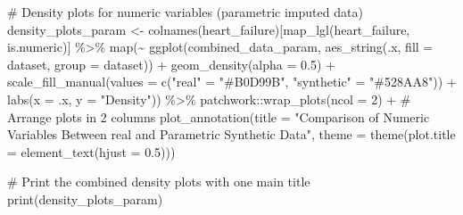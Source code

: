 \documentclass[
  letterpaper,
  DIV=11,
  numbers=noendperiod]{scrartcl}
\newenvironment{Shaded}{\begin{snugshade}}{\end{snugshade}}
\newcommand{\AttributeTok}[1]{\textcolor[rgb]{0.40,0.45,0.13}{#1}}
\newcommand{\CommentTok}[1]{\textcolor[rgb]{0.37,0.37,0.37}{#1}}
\newcommand{\DecValTok}[1]{\textcolor[rgb]{0.68,0.00,0.00}{#1}}
\newcommand{\FloatTok}[1]{\textcolor[rgb]{0.68,0.00,0.00}{#1}}
\newcommand{\FunctionTok}[1]{\textcolor[rgb]{0.28,0.35,0.67}{#1}}
\newcommand{\NormalTok}[1]{\textcolor[rgb]{0.00,0.23,0.31}{#1}}
\newcommand{\OtherTok}[1]{\textcolor[rgb]{0.00,0.23,0.31}{#1}}
\newcommand{\SpecialCharTok}[1]{\textcolor[rgb]{0.37,0.37,0.37}{#1}}
\newcommand{\StringTok}[1]{\textcolor[rgb]{0.13,0.47,0.30}{#1}}
\begin{document}
\begin{Shaded}
\begin{Highlighting}[]
\CommentTok{\# Density plots for numeric variables (parametric imputed data)}
\NormalTok{density\_plots\_param }\OtherTok{\textless{}{-}} \FunctionTok{colnames}\NormalTok{(heart\_failure)[}\FunctionTok{map\_lgl}\NormalTok{(heart\_failure, is.numeric)] }\SpecialCharTok{\%\textgreater{}\%}
  \FunctionTok{map}\NormalTok{(}\SpecialCharTok{\textasciitilde{}} \FunctionTok{ggplot}\NormalTok{(combined\_data\_param, }\FunctionTok{aes\_string}\NormalTok{(.x, }\AttributeTok{fill =} \StringTok{\textquotesingle{}dataset\textquotesingle{}}\NormalTok{, }\AttributeTok{group =} \StringTok{\textquotesingle{}dataset\textquotesingle{}}\NormalTok{)) }\SpecialCharTok{+}
        \FunctionTok{geom\_density}\NormalTok{(}\AttributeTok{alpha =} \FloatTok{0.5}\NormalTok{) }\SpecialCharTok{+}
        \FunctionTok{scale\_fill\_manual}\NormalTok{(}\AttributeTok{values =} \FunctionTok{c}\NormalTok{(}\StringTok{"real"} \OtherTok{=} \StringTok{"\#B0D99B"}\NormalTok{, }\StringTok{"synthetic"} \OtherTok{=} \StringTok{"\#528AA8"}\NormalTok{)) }\SpecialCharTok{+}
        \FunctionTok{labs}\NormalTok{(}\AttributeTok{x =}\NormalTok{ .x, }\AttributeTok{y =} \StringTok{"Density"}\NormalTok{)) }\SpecialCharTok{\%\textgreater{}\%}
\NormalTok{  patchwork}\SpecialCharTok{::}\FunctionTok{wrap\_plots}\NormalTok{(}\AttributeTok{ncol =} \DecValTok{2}\NormalTok{) }\SpecialCharTok{+}  \CommentTok{\# Arrange plots in 2 columns}
  \FunctionTok{plot\_annotation}\NormalTok{(}\AttributeTok{title =} \StringTok{"Comparison of Numeric Variables Between real and Parametric Synthetic Data"}\NormalTok{,}
                  \AttributeTok{theme =} \FunctionTok{theme}\NormalTok{(}\AttributeTok{plot.title =} \FunctionTok{element\_text}\NormalTok{(}\AttributeTok{hjust =} \FloatTok{0.5}\NormalTok{)))}

\CommentTok{\# Print the combined density plots with one main title}
\FunctionTok{print}\NormalTok{(density\_plots\_param)}
\end{Highlighting}
\end{Shaded}
\end{document}
